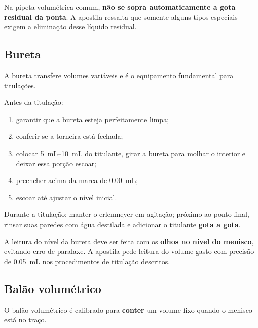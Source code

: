 \documentclass[a4paper,12pt]{article}
\begin{document}
\begin{memorize}
Na pipeta volumétrica comum, \textbf{não se sopra automaticamente a gota residual da ponta}. A apostila ressalta que somente alguns tipos especiais exigem a eliminação desse líquido residual.
\end{memorize}

\subsection{Bureta}

A bureta transfere volumes variáveis e é o equipamento fundamental para titulações.

\begin{procedimento}
Antes da titulação:
\begin{enumerate}[leftmargin=1.7em]
    \item garantir que a bureta esteja perfeitamente limpa;
    \item conferir se a torneira está fechada;
    \item colocar \SIrange{5}{10}{\milli\liter} do titulante, girar a bureta para molhar o interior e deixar essa porção escoar;
    \item preencher acima da marca de \SI{0.00}{\milli\liter};
    \item escoar até ajustar o nível inicial.
\end{enumerate}
Durante a titulação: manter o erlenmeyer em agitação; próximo ao ponto final, rinsar suas paredes com água destilada e adicionar o titulante \textbf{gota a gota}.
\end{procedimento}

\begin{memorize}
A leitura do nível da bureta deve ser feita com os \textbf{olhos no nível do menisco}, evitando erro de paralaxe. A apostila pede leitura do volume gasto com precisão de \SI{0.05}{\milli\liter} nos procedimentos de titulação descritos.
\end{memorize}

\subsection{Balão volumétrico}

O balão volumétrico é calibrado para \textbf{conter} um volume fixo quando o menisco está no traço.
\end{document}
